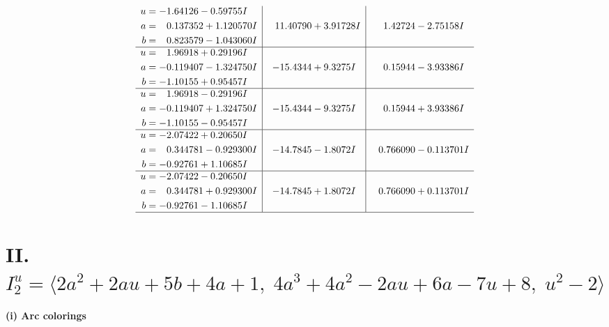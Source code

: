 \documentclass[1p]{elsarticle_modified}
\theoremstyle{definition}
\begin{document}
$$\begin{array}{c|c|c}
\begin{aligned}
u &= -1.64126 - 0.59755 I \\
a &= \phantom{-}0.137352 + 1.120570 I \\
b &= \phantom{-}0.823579 - 1.043060 I\end{aligned}
 & \phantom{-}11.40790 + 3.91728 I & \phantom{-}1.42724 - 2.75158 I \\ \hline\begin{aligned}
u &= \phantom{-}1.96918 + 0.29196 I \\
a &= -0.119407 - 1.324750 I \\
b &= -1.10155 + 0.95457 I\end{aligned}
 & -15.4344 + 9.3275 I & \phantom{-}0.15944 - 3.93386 I \\ \hline\begin{aligned}
u &= \phantom{-}1.96918 - 0.29196 I \\
a &= -0.119407 + 1.324750 I \\
b &= -1.10155 - 0.95457 I\end{aligned}
 & -15.4344 - 9.3275 I & \phantom{-}0.15944 + 3.93386 I \\ \hline\begin{aligned}
u &= -2.07422 + 0.20650 I \\
a &= \phantom{-}0.344781 - 0.929300 I \\
b &= -0.92761 + 1.10685 I\end{aligned}
 & -14.7845 - 1.8072 I & \phantom{-}0.766090 - 0.113701 I \\ \hline\begin{aligned}
u &= -2.07422 - 0.20650 I \\
a &= \phantom{-}0.344781 + 0.929300 I \\
b &= -0.92761 - 1.10685 I\end{aligned}
 & -14.7845 + 1.8072 I & \phantom{-}0.766090 + 0.113701 I\\
 \hline 
 \end{array}$$\newpage\newpage\renewcommand{\arraystretch}{1}
\centering \section*{II. $I^u_{2}= \langle 2 a^2+2 a u+5 b+4 a+1,\;4 a^3+4 a^2-2 a u+6 a-7 u+8,\;u^2-2 \rangle$}
\flushleft \textbf{(i) Arc colorings}\\
\end{document}
